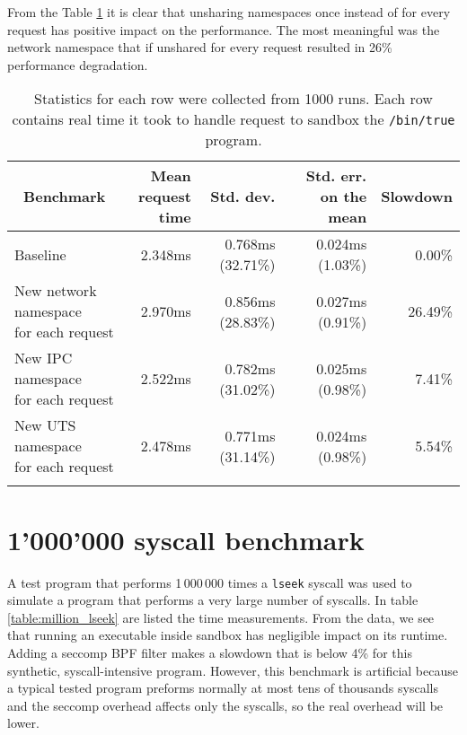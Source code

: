 \documentclass[en]{pracamgr}
\begin{document}
From the Table \ref{table:optimization_impact} it is clear that unsharing namespaces once instead of for every request has positive impact on the performance. The most meaningful was the network namespace that if unshared for every request resulted in 26\% performance degradation.

\begin{small}
\begin{longtable}{|l|r|r|r|r|}
\hline
\multicolumn{1}{|c|}{Benchmark} & \makecell{Mean\\request time} & Std. dev. & Std. err. on the mean & \multicolumn{1}{c|}{Slowdown} \\
\hline
Baseline                                              & 2.348ms & 0.768ms (32.71\%) & 0.024ms (1.03\%) & 0.00\% \\
\hline
\makecell{New network namespace \\ for each request}  & 2.970ms & 0.856ms (28.83\%) & 0.027ms (0.91\%) & 26.49\% \\
\hline
\makecell{New IPC namespace \\ for each request}      & 2.522ms & 0.782ms (31.02\%) & 0.025ms (0.98\%) & 7.41\% \\
\hline
\makecell{New UTS namespace \\ for each request}      & 2.478ms & 0.771ms (31.14\%) & 0.024ms (0.98\%) & 5.54\% \\
\hline
\caption{Statistics for each row were collected from 1000 runs. Each row contains real time it took to handle request to sandbox the \texttt{/bin/true} program.}
\label{table:optimization_impact}
\end{longtable}
\end{small}

\iffalse
\section{1'000'000 syscall benchmark}

A test program that performs 1\,000\,000 times a \texttt{lseek} syscall was used to simulate a program that performs a very large number of syscalls. In table \ref{table:million_lseek} are listed the time measurements. From the data, we see that running an executable inside sandbox has negligible impact on its runtime. Adding a seccomp BPF filter makes a slowdown that is below 4\% for this synthetic, syscall-intensive program. However, this benchmark is artificial because a typical tested program preforms normally at most tens of thousands syscalls and the seccomp overhead affects only the syscalls, so the real overhead will be lower.
\end{document}
